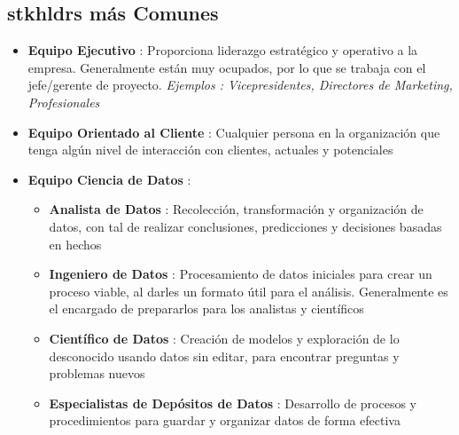 \subsection{\gls{stkhldrs} más Comunes}
\begin{itemize}
    \item {\textbf{Equipo Ejecutivo} : Proporciona liderazgo estratégico y operativo a la empresa. Generalmente están muy ocupados, por lo que se trabaja con el jefe/gerente de proyecto. \textit{Ejemplos : Vicepresidentes, Directores de Marketing, Profesionales}}
    \item {\textbf{Equipo Orientado al Cliente} : Cualquier persona en la organización que tenga algún nivel de interacción con clientes, actuales y potenciales}
    \item {\textbf{Equipo Ciencia de Datos} : 
    \begin{itemize}
        \item {\textbf{Analista de Datos} : Recolección, transformación y organización de datos, con tal de realizar conclusiones, predicciones y decisiones basadas en hechos}
        \item {\textbf{Ingeniero de Datos} : Procesamiento de datos iniciales para crear un proceso viable, al darles un formato útil para el análisis. Generalmente es el encargado de prepararlos para los analistas y científicos}
        \item {\textbf{Científico de Datos} : Creación de modelos y exploración de lo desconocido usando datos sin editar, para encontrar preguntas y problemas nuevos}
        \item {\textbf{Especialistas de Depósitos de Datos} : Desarrollo de procesos y procedimientos para guardar y organizar datos de forma efectiva}
    \end{itemize}}
\end{itemize}

\newpage